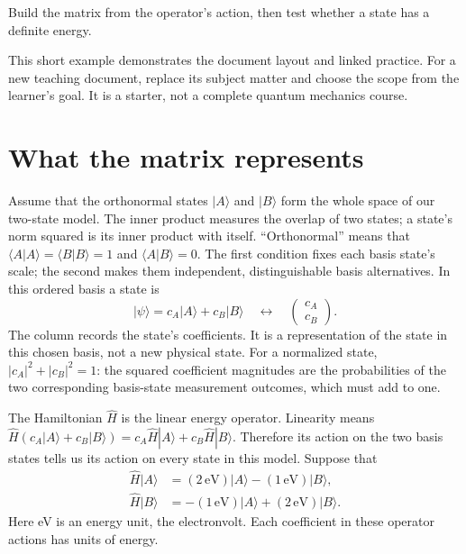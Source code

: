 \documentclass[11pt,a4paper]{article}
\begin{document}
  {Build the matrix from the operator's action, then test whether a state has
   a definite energy.}

This short example demonstrates the document layout and linked practice.
For a new teaching document, replace its subject matter and choose the scope
from the learner's goal. It is a starter, not a complete quantum mechanics
course.

\section{What the matrix represents}

Assume that the orthonormal states $|A\rangle$ and $|B\rangle$ form the whole
space of our two-state model. The inner product measures the overlap of
two states; a state's norm squared is its inner product with itself.
``Orthonormal'' means that
$\langle A|A\rangle=\langle B|B\rangle=1$ and
$\langle A|B\rangle=0$. The first condition fixes each basis state's scale;
the second makes them independent, distinguishable basis alternatives.
In this ordered basis a state is
\[
 |\psi\rangle=c_A|A\rangle+c_B|B\rangle
 \quad\longleftrightarrow\quad
 \begin{pmatrix}c_A\\c_B\end{pmatrix}.
\]
The column records the state's coefficients. It is a representation of the
state in this chosen basis, not a new physical state.
For a normalized state, $|c_A|^2+|c_B|^2=1$: the squared coefficient
magnitudes are the probabilities of the two corresponding basis-state
measurement outcomes, which must add to one.

The Hamiltonian $\hat H$ is the linear energy operator. Linearity means
$\hat H(c_A|A\rangle+c_B|B\rangle)
=c_A\hat H|A\rangle+c_B\hat H|B\rangle$.
Therefore its action on the two basis states tells us its action on every
state in this model. Suppose that
\begin{align}
 \hat H|A\rangle&=(2\,\mathrm{eV})|A\rangle
                  -(1\,\mathrm{eV})|B\rangle,\\
 \hat H|B\rangle&=-(1\,\mathrm{eV})|A\rangle
                  +(2\,\mathrm{eV})|B\rangle.
\end{align}
Here eV is an energy unit, the electronvolt. Each coefficient in these
operator actions has units of energy.
\end{document}
